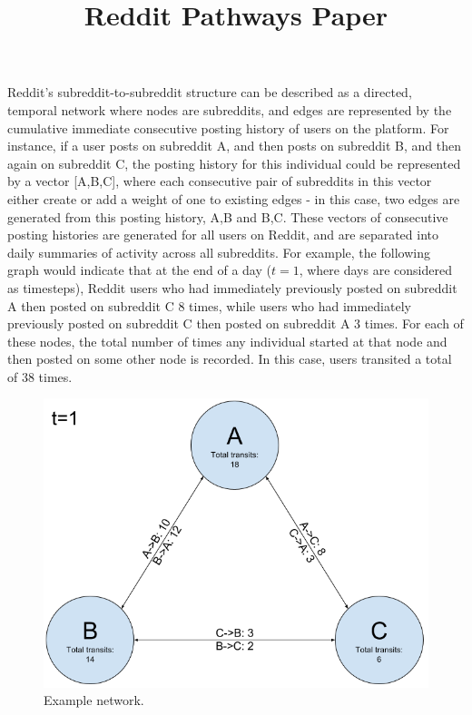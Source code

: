 \documentclass[letterpaper,12pt]{article}
\title{Reddit Pathways Paper}
\begin{document}
\maketitle
\doublespacing

Reddit's subreddit-to-subreddit structure can be described as a directed, temporal network where nodes are subreddits, and edges are represented by the cumulative immediate consecutive posting history of users on the platform. For instance, if a user posts on subreddit A, and then posts on subreddit B, and then again on subreddit C, the posting history for this individual could be represented by a vector [A,B,C], where each consecutive pair of subreddits in this vector either create or add a weight of one to existing edges - in this case, two edges are generated from this posting history, A,B and B,C. These vectors of consecutive posting histories are generated for all users on Reddit, and are separated into daily summaries of activity across all subreddits. For example, the following graph would indicate that at the end of a day ($t=1$, where days are considered as timesteps), Reddit users who had immediately previously posted on subreddit A then posted on subreddit C 8 times, while users who had immediately previously posted on subreddit C then posted on subreddit A 3 times. For each of these nodes, the total number of times any individual started at that node and then posted on some other node is recorded. In this case, users transited a total of 38 times.

\begin{figure}[h]
  \centering
  \includegraphics[width=\textwidth]{random_walk_ex}
  \caption{Example network.}
  \label{fig:random_walk_ex}
\end{figure}
\end{document}
